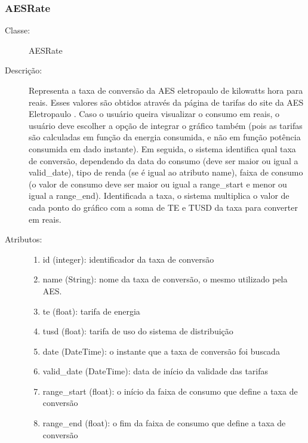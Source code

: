 \subsubsection{AESRate}
\begin{description}
  \item[Classe:] AESRate
  \item[Descrição:] Representa a taxa de conversão da AES eletropaulo de kilowatts hora para reais. Esses valores são obtidos através da página de tarifas do site da AES Eletropaulo \cite{aes_site}. Caso o usuário queira visualizar o consumo em reais, o usuário deve escolher a opção de integrar o gráfico também (pois as tarifas são calculadas em função da energia consumida, e não em função potência consumida em dado instante). Em seguida, o sistema identifica qual taxa de conversão, dependendo da data do consumo (deve ser maior ou igual a valid\_date), tipo de renda (se é igual ao atributo name), faixa de consumo (o valor de consumo deve ser maior ou igual a range\_start e menor ou igual a range\_end). Identificada a taxa, o sistema multiplica o valor de cada ponto do gráfico com a soma de TE e TUSD da taxa para converter em reais.
  \item[Atributos:] \hfill
    \begin{enumerate}
      \item id (integer): identificador da taxa de conversão
      \item name (String): nome da taxa de conversão, o mesmo utilizado pela AES.
      \item te (float): tarifa de energia
      \item tusd (float): tarifa de uso do sistema de distribuição
      \item date (DateTime): o instante que a taxa de conversão foi buscada
      \item valid\_date (DateTime): data de início da validade das tarifas
      \item range\_start (float): o início da faixa de consumo que define a taxa de conversão
        \item range\_end (float): o fim da faixa de consumo que define a taxa de conversão
    \end{enumerate}
\end{description} 